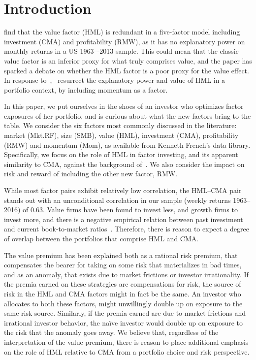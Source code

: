 \section{Introduction}
\textcite{FF2015} find that the value factor (HML) is redundant in a five-factor model including investment (CMA) and profitability (RMW), as it has no explanatory power on monthly returns in a US 1963–-2013 sample. This could mean that the classic value factor is an inferior proxy for what truly comprises value, and the paper has sparked a debate on whether the HML factor is a poor proxy for the value effect. In response to~\textcite{FF2015},~\textcite{Asness2015} resurrect the explanatory power and value of HML in a portfolio context, by including momentum as a factor.

In this paper, we put ourselves in the shoes of an investor who optimizes factor exposures of her portfolio, and is curious about what the new factors bring to the table. We consider the six factors most commonly discussed in the literature: market (Mkt.RF), size (SMB), value (HML), investment (CMA), profitability (RMW) and momentum (Mom), as available from Kenneth French's data library. Specifically, we focus on the role of HML in factor investing, and its apparent similarity to CMA, against the background of~\textcite{FF2015,Asness2015}. We also consider the impact on risk and reward of including the other new factor, RMW.

While most factor pairs exhibit relatively low correlation, the HML--CMA pair stands out with an unconditional correlation in our sample (weekly returns 1963--2016) of 0.63. Value firms have been found to invest less, and growth firms to invest more, and there is a negative empirical relation between past investment and current book-to-market ratios~\autocite{Zhang2005,AndersonGarciaFeijoo2006}. Therefore, there is reason to expect a degree of overlap between the portfolios that comprise HML and CMA.

The value premium has been explained both as a rational risk premium, that compensates the bearer for taking on some risk that materializes in bad times, and as an anomaly, that exists due to market frictions or investor irrationality. If the premia earned on these strategies are compensations for risk, the source of risk in the HML and CMA factors might in fact be the same. An investor who allocates to both these factors, might unwillingly double up on exposure to the same risk source. Similarly, if the premia earned are due to market frictions and irrational investor behavior, the naïve investor would double up on exposure to the risk that the anomaly goes away. We believe that, regardless of the interpretation of the value premium, there is reason to place additional emphasis on the role of HML relative to CMA from a portfolio choice and risk perspective.

